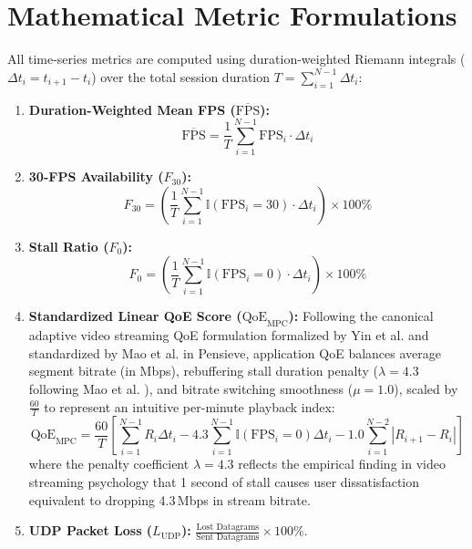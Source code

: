 \documentclass[12pt,a4paper,oneside]{report}
\begin{document}
\section{Mathematical Metric Formulations}
All time-series metrics are computed using duration-weighted Riemann integrals ($\Delta t_i = t_{i+1} - t_i$) over the total session duration $T = \sum_{i=1}^{N-1} \Delta t_i$:
\begin{enumerate}[label=\arabic*.]
  \item \textbf{Duration-Weighted Mean FPS ($\overline{\text{FPS}}$):}
  \begin{equation}
    \overline{\text{FPS}} = \frac{1}{T} \sum_{i=1}^{N-1} \text{FPS}_i \cdot \Delta t_i
  \end{equation}
  \item \textbf{30-FPS Availability ($F_{30}$):}
  \begin{equation}
    F_{30} = \left(\frac{1}{T} \sum_{i=1}^{N-1} \mathbb{I}(\text{FPS}_i = 30) \cdot \Delta t_i\right) \times 100\%
  \end{equation}
  \item \textbf{Stall Ratio ($F_0$):}
  \begin{equation}
    F_0 = \left(\frac{1}{T} \sum_{i=1}^{N-1} \mathbb{I}(\text{FPS}_i = 0) \cdot \Delta t_i\right) \times 100\%
  \end{equation}
  \item \textbf{Standardized Linear QoE Score ($\text{QoE}_{\text{MPC}}$):} Following the canonical adaptive video streaming QoE formulation formalized by Yin et al. \cite{yin2015mpc} and standardized by Mao et al. \cite{mao2017pensieve} in Pensieve, application QoE balances average segment bitrate (in Mbps), rebuffering stall duration penalty ($\lambda = 4.3$ following Mao et al. \cite{mao2017pensieve}), and bitrate switching smoothness ($\mu = 1.0$), scaled by $\frac{60}{T}$ to represent an intuitive per-minute playback index:
  \begin{equation}
    \text{QoE}_{\text{MPC}} = \frac{60}{T} \left[ \sum_{i=1}^{N-1} R_i \Delta t_i - 4.3 \sum_{i=1}^{N-1} \mathbb{I}(\text{FPS}_i = 0) \Delta t_i - 1.0 \sum_{i=1}^{N-2} |R_{i+1} - R_i| \right]
    \label{eq:mpc_qoe_metric}
  \end{equation}
  where the penalty coefficient $\lambda = 4.3$ reflects the empirical finding in video streaming psychology that 1 second of stall causes user dissatisfaction equivalent to dropping 4.3\,Mbps in stream bitrate.
  \item \textbf{UDP Packet Loss ($L_{\text{UDP}}$):} $\frac{\text{Lost Datagrams}}{\text{Sent Datagrams}} \times 100\%$.
\end{enumerate}
\end{document}

